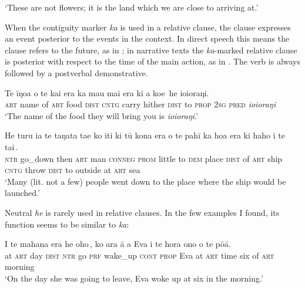 \glt 
‘These are not flowers; it is the land which we are close to arriving at.’ \textstyleExampleref{[R210.197]} 
\z

When the contiguity marker \textit{ka} is used in a relative clause, the clause expresses an event posterior to the events in the context. In direct speech this means the clause refers to the future, as in ; in narrative texts the \textit{ka}{}-marked relative clause is posterior with respect to the time of the main action, as in . The verb is always followed by a postverbal demonstrative.

\ea\label{ex:11.117}
\gll Te {\ꞌ}īŋoa o te kai era {\ob}ka ma{\ꞌ}u mai era ki a koe\,{\cb} he ioioraŋi. \\
\textsc{art} name of \textsc{art} food \textsc{dist} {\db}\textsc{cntg} carry hither \textsc{dist} to \textsc{prop} \textsc{2sg} \textsc{pred} \textit{ioioraŋi} \\

\glt 
‘The name of the food they will bring you is \textit{ioioraŋi}.’ \textstyleExampleref{[R310.060]} 
\z

\ea\label{ex:11.118}
\gll He turu ia te taŋata ta{\ꞌ}e ko {\ꞌ}iti ki tū kona era o te pahī {\ob}ka hoa era ki haho i te tai\,{\cb}.\\
\textsc{ntr} go\_down then \textsc{art} man \textsc{conneg} \textsc{prom} little to \textsc{dem} place \textsc{dist} of \textsc{art} ship  {\db}\textsc{cntg} throw \textsc{dist} to outside at \textsc{art} sea\\

\glt 
‘Many (lit. not a few) people went down to the place where the ship would be launched.’ \textstyleExampleref{[R250.211]} 
\z

Neutral \textit{he} is rarely used in relative clauses. In the few examples I found, its function seems to be similar to \textit{ka}:

\ea\label{ex:11.119}
\gll {\ꞌ}I te mahana era {\ob}he oho\,{\cb}, ko {\ꞌ}ara {\ꞌ}ā a Eva {\ꞌ}i te hora ono  o te pō{\ꞌ}ā.\\
at \textsc{art} day \textsc{dist} {\db}\textsc{ntr} go \textsc{prf} wake\_up \textsc{cont} \textsc{prop} Eva at \textsc{art} time six  of \textsc{art} morning\\

\glt 
‘On the day she was going to leave, Eva woke up at six in the morning.’ \textstyleExampleref{[R210.028]} 
\z

